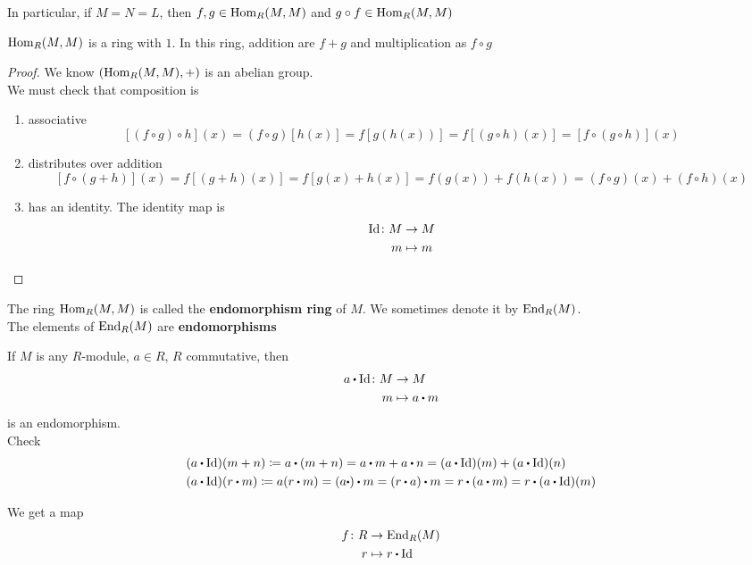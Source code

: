 \documentclass[../Main.tex]{subfiles}
\begin{document}
In particular, if $M=N=L$, then $f,g \in \operatorname{Hom}_R(M,M)$ and $g\circ f \in \operatorname{Hom}_R(M,M)$
\begin{crl}
	$\operatorname{Hom}_R(M,M)$ is a ring with $1$. In this ring, addition are $f+g$ and multiplication as $f\circ g$
\end{crl}
\begin{proof}
	We know $(\operatorname{Hom}_R(M,M),+)$ is an abelian group.\\
	We must check that composition is 
	\begin{enumerate}
		\item associative
		\[[(f\circ g) \circ h](x) = (f\circ g)[h(x)] = f[g(h(x))] = f[(g\circ h)(x)] = [f\circ (g\circ h)](x)\]
		\item distributes over addition
		\[[f\circ (g+h)](x) = f[(g+h)(x)] = f[g(x)+h(x)] = f(g(x)) +f(h(x)) = (f\circ g)(x) + (f\circ h)(x)\]
		\item has an identity.
		The identity map is
		\begin{align*}
		\operatorname{Id} \colon M&\to M \\
		m&\mapsto m
		\end{align*}
	\end{enumerate}
\end{proof}
\begin{dfn}[title = Endomorphisms and Endomorphism Ring]
	The ring $\operatorname{Hom}_R(M,M)$ is called the \textbf{endomorphism ring} of $M$. We sometimes denote it by $\operatorname{End}_R(M)$.\\
	The elements of $\operatorname{End}_R(M)$ are \textbf{endomorphisms}
\end{dfn}
\begin{example}
	If $M$ is any $R$-module, $a\in R$, $R$ commutative, then 
	\begin{align*}
	a\rdot \Id \colon M &\to M \\
	m&\mapsto a\rdot m
	\end{align*}
	is an endomorphism.\\
	Check
	\begin{align*}
	&(a\rdot \Id)(m+n)\coloneqq a\rdot (m+n) = a\rdot m + a\rdot n = (a\rdot \Id)(m) + (a\rdot \Id)(n)\\
	&(a\rdot \Id)(r\rdot m) \coloneqq a(r\rdot m) = (a\rdot )\rdot m = (r\rdot a)\rdot m = r\rdot (a\rdot m) = r\rdot (a\rdot \Id)(m)
	\end{align*}
\end{example}
We get a map
\begin{align*}
f\colon R&\to \End_R(M)\\
r&\mapsto r\rdot \Id
\end{align*}
\end{document}
